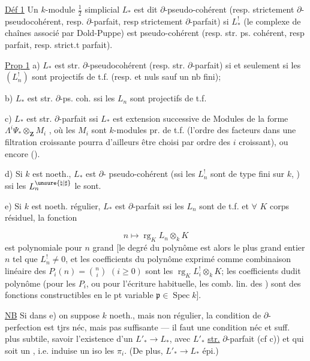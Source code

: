 \uline{Déf 1} Un $k$-module $\frac12$ simplicial $L_*$ est dit
$\partial$-pseudo-cohérent (resp. strictement $\partial$-pseudocohérent,
resp. $\partial$-parfait, resp strictement $\partial$-parfait)
si $L^!_*$ (le complexe de chaînes associé
par Dold-Puppe) est pseudo-cohérent
(resp. str. ps. cohérent, resp parfait, resp.
strict.t parfait).

\uline{Prop 1} a) $L_*$ est str. $\partial$-pseudocohérent
(resp. str. $\partial$-parfait) si et seulement si les
$(L^!_n)$ sont projectifs de t.f. (resp. et
nuls sauf un nb fini); 

b) $L_*$ est str. $\partial$-ps. coh. ssi les $L_n$
sont projectifs de t.f.

c) $L_*$ est str. $\partial$-parfait ssi $L_*$ est
extension successive  de Modules de
la forme $\Lambda^i\Psi_*\otimes_{\mathbf Z}M_i$
, où les
$M_i$ sont $k$-modules pr. de t.f.
(l'ordre des facteurs dans une filtration
croissante  pourra d'ailleurs
être choisi par ordre des $i$
croissant), ou encore 
().

d) Si $k$ est noeth., $L_*$ est $\partial$-
pseudo-cohérent (ssi les $L^!_n$ sont
de type fini sur $k$, ) ssi
les $L^{\unsure{\natural|\sharp}}_n$ le sont.

e) Si $k$ est noeth. régulier, $L_*$ est
$\partial$-parfait ssi les $L_n$ sont de t.f.
et  $\forall$ $K$ corps résiduel, la fonction

\[
n\longmapsto\operatorname{rg}_K L_n\otimes_k K
\]
est polynomiale pour $n$ grand [le
degré du polynôme 
est alors le plus
grand entier $n$ tel que $L^!_n\neq0$, et les
coefficients du polynôme exprimé comme
combinaison linéaire des $P_i(n)=\binom ni$
$(i\geq0)$ sont les $\operatorname{rg}_K L^!_i\otimes_k K$;
les coefficients
dudit polynôme (pour les $P_i$, ou
pour l'écriture habituelle,  les
comb. lin. des ) sont des
fonctions constructibles en le pt variable
$\mathfrak p\in\operatorname{Spec}k$].

\uline{NB} Si dans e) on suppose $k$ noeth.,
mais non régulier, la condition  de
$\partial$-perfection est tjrs néc, mais pas
suffisante --- il faut une condition
néc et suff. plus subtile, savoir
l'existence d'un $L'_*\longrightarrow L_*$, avec
$L'_*$ \uline{str.} $\partial$-parfait (cf c)) et qui
soit un   , i.e. induise un iso
 les $\pi_i$. (De plus,  $L'_*\longrightarrow L_*$
épi.)

